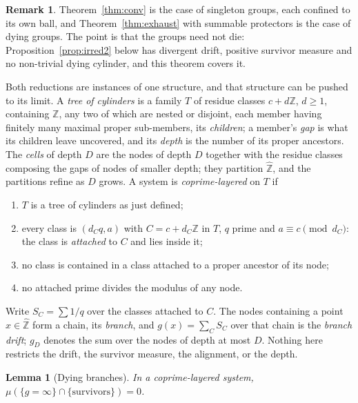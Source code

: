 \documentclass[11pt]{article}
\theoremstyle{plain}
\newtheorem{lemma}[theorem]{Lemma}
\theoremstyle{definition}
\newtheorem{remark}[theorem]{Remark}
\newcommand{\Zhat}{\widehat{\mathbb{Z}}}
\begin{document}
\begin{remark}
Theorem~\ref{thm:conv} is the case of singleton groups, each
confined to its own ball, and Theorem~\ref{thm:exhaust} with
summable protectors is the case of dying groups.  The point is
that the groups need not die: Proposition~\ref{prop:irred2}
below has divergent drift, positive survivor measure and no
non-trivial dying cylinder, and this theorem covers it.
\end{remark}

Both reductions are instances of one structure, and that
structure can be pushed to its limit.  A \emph{tree of
cylinders} is a family $T$ of residue classes $c+d\mathbb{Z}$,
$d\ge1$, containing $\mathbb{Z}$, any two of which are nested or
disjoint, each member having finitely many maximal proper
sub-members, its \emph{children}; a member's \emph{gap} is what
its children leave uncovered, and its \emph{depth} is the number
of its proper ancestors.  The \emph{cells} of depth $D$ are the
nodes of depth $D$ together with the residue classes composing
the gaps of nodes of smaller depth; they partition $\Zhat$, and
the partitions refine as $D$ grows.  A system is \emph{coprime-layered} on
$T$ if
\begin{enumerate}
\item[(T1)] $T$ is a tree of cylinders as just defined;
\item[(T2)] every class is $(d_Cq,a)$ with $C=c+d_C\mathbb{Z}$ in
$T$, $q$ prime and $a\equiv c\pmod{d_C}$: the class is
\emph{attached} to $C$ and lies inside it;
\item[(T3)] no class is contained in a class attached to a
proper ancestor of its node;
\item[(T4)] no attached prime divides the modulus of any node.
\end{enumerate}
Write $S_C=\sum1/q$ over the classes attached to $C$.  The
nodes containing a point $x\in\Zhat$ form a chain, its
\emph{branch}, and $g(x)=\sum_CS_C$ over that chain is the
\emph{branch drift}; $g_D$ denotes the sum over the nodes of
depth at most $D$.  Nothing here restricts the drift, the
survivor measure, the alignment, or the depth.

\begin{lemma}[Dying branches]\label{lem:dying}
In a coprime-layered system, $\mu(\{g=\infty\}\cap
\{\text{survivors}\})=0$.
\end{lemma}
\end{document}
